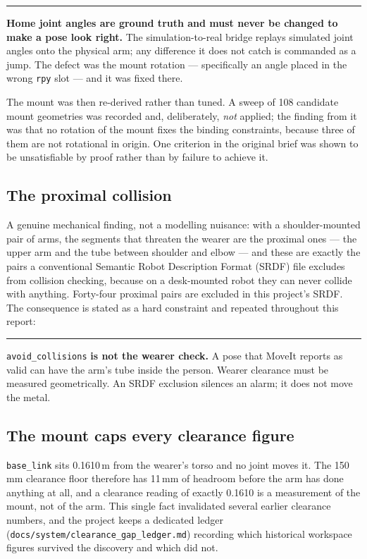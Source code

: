\documentclass[11pt,a4paper,oneside]{report}
\newcommand{\code}[1]{\texttt{\small #1}}
\newcommand{\file}[1]{\texttt{\small #1}}
\newcommand{\keyfact}[1]{%
  \par\vspace{7pt}\noindent
  \hspace*{0pt}\textcolor{srlblue}{\rule{2.5pt}{\dimexpr\baselineskip\relax}}%
  \hspace{9pt}%
  \begin{minipage}[t]{\dimexpr\textwidth-14pt\relax}
  \small #1
  \end{minipage}\par\vspace{7pt}}
\begin{document}
\keyfact{\textbf{Home joint angles are ground truth and must never be changed
to make a pose look right.} The simulation-to-real bridge replays simulated
joint angles onto the physical arm; any difference it does not catch is
commanded as a jump. The defect was the mount rotation --- specifically an
angle placed in the wrong \code{rpy} slot --- and it was fixed there.}

The mount was then re-derived rather than tuned. A sweep of 108 candidate
mount geometries was recorded and, deliberately, \emph{not} applied; the
finding from it was that no rotation of the mount fixes the binding
constraints, because three of them are not rotational in origin. One
criterion in the original brief was shown to be unsatisfiable by proof rather
than by failure to achieve it.

\subsection{The proximal collision}

A genuine mechanical finding, not a modelling nuisance: with a shoulder-mounted
pair of arms, the segments that threaten the wearer are the proximal ones ---
the upper arm and the tube between shoulder and elbow --- and these are exactly
the pairs a conventional Semantic Robot Description Format (SRDF) file excludes
from collision checking, because on a desk-mounted robot they can never
collide with anything. Forty-four proximal pairs are excluded in this
project's SRDF. The consequence is stated as a hard constraint and repeated
throughout this report:

\keyfact{\code{avoid\_collisions} \textbf{is not the wearer check.} A pose that
MoveIt reports as valid can have the arm's tube inside the person. Wearer
clearance must be measured geometrically. An SRDF exclusion silences an alarm;
it does not move the metal.}

\subsection{The mount caps every clearance figure}

\code{base\_link} sits 0.1610\,m from the wearer's torso and no joint moves it.
The 150\,mm clearance floor therefore has 11\,mm of headroom before the arm has
done anything at all, and a clearance reading of exactly 0.1610 is a
measurement of the mount, not of the arm. This single fact invalidated several
earlier clearance numbers, and the project keeps a dedicated ledger
(\file{docs/system/clearance\_gap\_ledger.md}) recording which historical
workspace figures survived the discovery and which did not.
\end{document}
